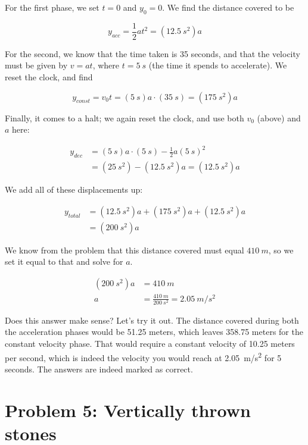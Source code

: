 \documentclass[8.01x]{subfiles}
\begin{document}
For the first phase, we set $t = 0$ and $y_0 = 0$. We find the distance covered to be 

\begin{equation}
y_{acc} = \frac{1}{2} a t^2 = (\SI{12.5}{s^2}) a
\end{equation}

For the second, we know that the time taken is 35 seconds, and that the velocity must be given by $v = a t$, where $t = \SI{5}{s}$ (the time it spends to accelerate). We reset the clock, and find

\begin{equation}
y_{const} = v_0 t = (\SI{5}{s})a \cdot (\SI{35}{s}) = (\SI{175}{s^2}) a
\end{equation}

Finally, it comes to a halt; we again reset the clock, and use both $v_0$ (above) and $a$ here:

\begin{align}
y_{dec} &= (\SI{5}{s})a \cdot (\SI{5}{s}) - \frac{1}{2} a (\SI{5}{s})^2\\
       &= (\SI{25}{s^2}) - (\SI{12.5}{s^2}) a = (\SI{12.5}{s^2}) a
\end{align}

We add all of these displacements up:

\begin{align}
y_{total} &= (\SI{12.5}{s^2}) a + (\SI{175}{s^2}) a + (\SI{12.5}{s^2}) a\\
          &= (\SI{200}{s^2}) a
\end{align}

We know from the problem that this distance covered must equal $\SI{410}{m}$, so we set it equal to that and solve for $a$.

\begin{align}
(\SI{200}{s^2}) a &= \SI{410}{m}\\
a &= \frac{\SI{410}{m}}{\SI{200}{s^2}} = \SI{2.05}{m/s^2}
\end{align}

Does this answer make sense? Let's try it out. The distance covered during both the acceleration phases would be 51.25 meters, which leaves 358.75 meters for the constant velocity phase. That would require a constant velocity of 10.25 meters per second, which is indeed the velocity you would reach at \SI{2.05}{m/s^2} for 5 seconds. The answers are indeed marked as correct.

\section{Problem 5: Vertically thrown stones}
\end{document}
